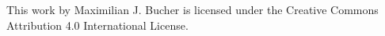 \null\vspace{19cm}
This work by Maximilian J. Bucher is licensed under the Creative Commons Attribution 4.0 International License.